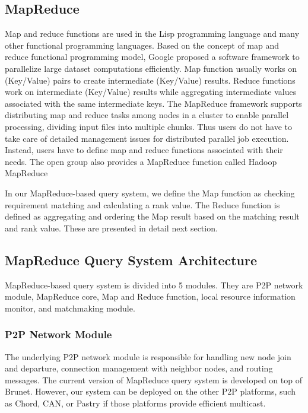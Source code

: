 \documentclass{acm_proc_article-sp}
\begin{document}
\subsection{MapReduce}
Map and reduce functions are used in the Lisp programming language and many other functional programming languages. 
Based on the concept of map and reduce functional programming model, Google proposed a software framework to parallelize large dataset computations efficiently\cite{google_mapreduce}.
Map function usually works on (Key/Value) pairs to create intermediate (Key/Value) results. 
Reduce functions work on intermediate (Key/Value) results while aggregating intermediate values associated with the same intermediate keys.
The MapReduce framework supports distributing map and reduce tasks among nodes in a cluster to enable parallel processing, dividing input files into multiple chunks. 
Thus users do not have to take care of detailed management issues for distributed parallel job execution. 
Instead, users have to define map and reduce functions associated with their needs.
The open group also provides a MapReduce function called Hadoop MapReduce\cite{hadoop}

In our MapReduce-based query system, we define the Map function as checking requirement matching and calculating a rank value. The Reduce function is defined as 
aggregating and ordering the Map result based on the matching result and rank value. These are presented in detail next section.

\subsection{MapReduce Query System Architecture}
MapReduce-based query system is divided into 5 modules. They are P2P network module, MapReduce core, Map and Reduce function, local resource information monitor, and matchmaking module.
\subsubsection{P2P Network Module}
The underlying P2P network module is responsible for handling new node join and departure, connection management with neighbor nodes, and routing messages. 
The current version of MapReduce query system is developed on top of Brunet\cite{brunet}.
However, our system can be deployed on the other P2P platforms, such as Chord\cite{chord}, CAN\cite{can}, or Pastry\cite{pastry} if those platforms provide efficient multicast. 
\end{document}
